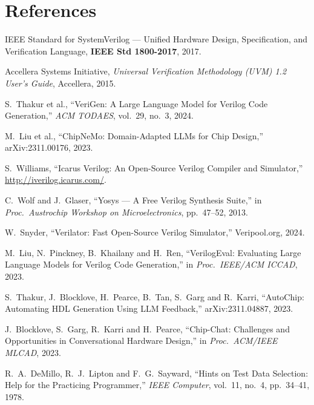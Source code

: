 \documentclass[11pt,a4paper]{article}
\begin{document}
\section*{References}
\begin{enumerate}[label={[\arabic*]},ref={\arabic*},leftmargin=2.2em,itemsep=0pt,parsep=0pt]
\item IEEE Standard for SystemVerilog --- Unified Hardware Design, Specification,
and Verification Language, \textbf{IEEE Std 1800-2017}, 2017.
\item Accellera Systems Initiative, \textit{Universal Verification Methodology
(UVM) 1.2 User's Guide}, Accellera, 2015.
\item\label{ref:verigen} S.~Thakur et al., ``VeriGen: A Large Language Model for Verilog Code
Generation,'' \textit{ACM TODAES}, vol.~29, no.~3, 2024.
\item\label{ref:chipnemo} M.~Liu et al., ``ChipNeMo: Domain-Adapted LLMs for Chip Design,'' arXiv:2311.00176, 2023.
\item S.~Williams, ``Icarus Verilog: An Open-Source Verilog Compiler and
Simulator,'' \url{http://iverilog.icarus.com/}.
\item C.~Wolf and J.~Glaser, ``Yosys --- A Free Verilog Synthesis Suite,'' in \textit{Proc.~Austrochip Workshop on Microelectronics}, pp.~47--52, 2013.
\item W.~Snyder, ``Verilator: Fast Open-Source Verilog Simulator,''
Veripool.org, 2024.
\item\label{ref:verilogeval} M.~Liu, N.~Pinckney, B.~Khailany and H.~Ren, ``VerilogEval: Evaluating Large Language Models for Verilog Code Generation,'' in \textit{Proc.~IEEE/ACM ICCAD}, 2023.
\item\label{ref:autochip} S.~Thakur, J.~Blocklove, H.~Pearce, B.~Tan, S.~Garg and R.~Karri, ``AutoChip: Automating HDL Generation Using LLM Feedback,'' arXiv:2311.04887, 2023.
\item\label{ref:chipchat} J.~Blocklove, S.~Garg, R.~Karri and H.~Pearce, ``Chip-Chat: Challenges and Opportunities in Conversational Hardware Design,'' in \textit{Proc.~ACM/IEEE MLCAD}, 2023.
\item\label{ref:demillo} R.~A.~DeMillo, R.~J.~Lipton and F.~G.~Sayward, ``Hints on Test Data Selection: Help for the Practicing Programmer,'' \textit{IEEE Computer}, vol.~11, no.~4, pp.~34--41, 1978.
\end{enumerate}

\appendix
\end{document}
